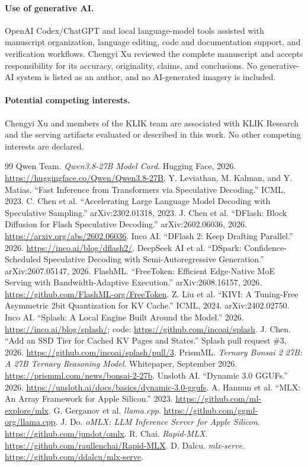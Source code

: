 \documentclass[11pt]{article}
\begin{document}
\paragraph{Use of generative AI.} OpenAI Codex/ChatGPT and local language-model tools assisted with manuscript organization, language editing, code and documentation support, and verification workflows. Chengyi Xu reviewed the complete manuscript and accepts responsibility for its accuracy, originality, claims, and conclusions. No generative-AI system is listed as an author, and no AI-generated imagery is included.
\paragraph{Potential competing interests.} Chengyi Xu and members of the KLIK team are associated with KLIK Research and the serving artifacts evaluated or described in this work. No other competing interests are declared.

\begin{thebibliography}{99}
 Qwen Team. \emph{Qwen3.8-27B Model Card}. Hugging Face, 2026. \url{https://huggingface.co/Qwen/Qwen3.8-27B}.
 Y. Leviathan, M. Kalman, and Y. Matias. ``Fast Inference from Transformers via Speculative Decoding.'' ICML, 2023.
 C. Chen et al. ``Accelerating Large Language Model Decoding with Speculative Sampling.'' arXiv:2302.01318, 2023.
 J. Chen et al. ``DFlash: Block Diffusion for Flash Speculative Decoding.'' arXiv:2602.06036, 2026. \url{https://arxiv.org/abs/2602.06036}.
 Inco AI. ``DFlash 2: Keep Drafting Parallel.'' 2026. \url{https://inco.ai/blog/dflash2/}.
 DeepSeek AI et al. ``DSpark: Confidence-Scheduled Speculative Decoding with Semi-Autoregressive Generation.'' arXiv:2607.05147, 2026.
 FlashML. ``FreeToken: Efficient Edge-Native MoE Serving with Bandwidth-Adaptive Execution.'' arXiv:2608.16157, 2026. \url{https://github.com/FlashML-org/FreeToken}.
 Z. Liu et al. ``KIVI: A Tuning-Free Asymmetric 2bit Quantization for KV Cache.'' ICML, 2024. arXiv:2402.02750.
 Inco AI. ``Splash: A Local Engine Built Around the Model.'' 2026. \url{https://inco.ai/blog/splash/}; code: \url{https://github.com/incoai/splash}.
 J. Chen. ``Add an SSD Tier for Cached KV Pages and States.'' Splash pull request \#3, 2026. \url{https://github.com/incoai/splash/pull/3}.
 PrismML. \emph{Ternary Bonsai 2 27B: A 27B Ternary Reasoning Model}. Whitepaper, September 2026. \url{https://prismml.com/news/bonsai-2-27b}.
 Unsloth AI. ``Dynamic 3.0 GGUFs.'' 2026. \url{https://unsloth.ai/docs/basics/dynamic-3.0-ggufs}.
 A. Hannun et al. ``MLX: An Array Framework for Apple Silicon.'' 2023. \url{https://github.com/ml-explore/mlx}.
 G. Gerganov et al. \emph{llama.cpp}. \url{https://github.com/ggml-org/llama.cpp}.
 J. Do. \emph{oMLX: LLM Inference Server for Apple Silicon}. \url{https://github.com/jundot/omlx}.
 R. Chai. \emph{Rapid-MLX}. \url{https://github.com/raullenchai/Rapid-MLX}.
 D. Dalcu. \emph{mlx-serve}. \url{https://github.com/ddalcu/mlx-serve}.
\end{thebibliography}
\end{document}
